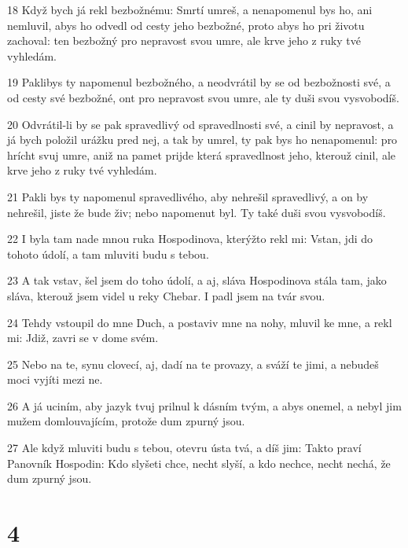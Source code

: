 \par 18 Když bych já rekl bezbožnému: Smrtí umreš, a nenapomenul bys ho, ani nemluvil, abys ho odvedl od cesty jeho bezbožné, proto abys ho pri životu zachoval: ten bezbožný pro nepravost svou umre, ale krve jeho z ruky tvé vyhledám.
\par 19 Paklibys ty napomenul bezbožného, a neodvrátil by se od bezbožnosti své, a od cesty své bezbožné, ont pro nepravost svou umre, ale ty duši svou vysvobodíš.
\par 20 Odvrátil-li by se pak spravedlivý od spravedlnosti své, a cinil by nepravost, a já bych položil urážku pred nej, a tak by umrel, ty pak bys ho nenapomenul: pro hrícht svuj umre, aniž na pamet prijde která spravedlnost jeho, kterouž cinil, ale krve jeho z ruky tvé vyhledám.
\par 21 Pakli bys ty napomenul spravedlivého, aby nehrešil spravedlivý, a on by nehrešil, jiste že bude živ; nebo napomenut byl. Ty také duši svou vysvobodíš.
\par 22 I byla tam nade mnou ruka Hospodinova, kterýžto rekl mi: Vstan, jdi do tohoto údolí, a tam mluviti budu s tebou.
\par 23 A tak vstav, šel jsem do toho údolí, a aj, sláva Hospodinova stála tam, jako sláva, kterouž jsem videl u reky Chebar. I padl jsem na tvár svou.
\par 24 Tehdy vstoupil do mne Duch, a postaviv mne na nohy, mluvil ke mne, a rekl mi: Jdiž, zavri se v dome svém.
\par 25 Nebo na te, synu clovecí, aj, dadí na te provazy, a sváží te jimi, a nebudeš moci vyjíti mezi ne.
\par 26 A já uciním, aby jazyk tvuj prilnul k dásním tvým, a abys onemel, a nebyl jim mužem domlouvajícím, protože dum zpurný jsou.
\par 27 Ale když mluviti budu s tebou, otevru ústa tvá, a díš jim: Takto praví Panovník Hospodin: Kdo slyšeti chce, necht slyší, a kdo nechce, necht nechá, že dum zpurný jsou.

\chapter{4}

